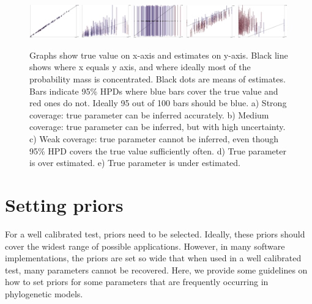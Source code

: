 \documentclass[oneside]{article}
\begin{document}
\begin{figure}
\includegraphics[width=0.19\textwidth]{../figures/bargraph-ok-strong}
\includegraphics[width=0.19\textwidth]{../figures/bargraph-ok-medium}
\includegraphics[width=0.19\textwidth]{../figures/bargraph-ok-weak}
\includegraphics[width=0.19\textwidth]{../figures/bargraph-under}
\includegraphics[width=0.19\textwidth]{../figures/bargraph-over}
\caption{\label{fig:coverage}
Graphs show true value on x-axis and estimates on y-axis. Black line shows where x equals y axis, and where ideally most of the probability mass is concentrated. Black dots are means of estimates. Bars indicate 95\% HPDs where blue bars cover the true value and red ones do not. Ideally 95 out of 100 bars should be blue.
a) Strong coverage: true parameter can be inferred accurately.
b) Medium coverage: true parameter can be inferred, but with high uncertainty.
c) Weak coverage: true parameter cannot be inferred, even though 95\% HPD covers the true value sufficiently often.
d) True parameter is over estimated.
e) True parameter is under estimated.
}
\end{figure}


\section{Setting priors}\label{setting-priors}

For a well calibrated test, priors need to be selected. Ideally, these priors should 
cover the widest range of possible applications. However, in many software implementations,
the priors are set so wide that when used in a well calibrated test, many parameters cannot
be recovered. Here, we provide some guidelines on how to set priors for some parameters
that are frequently occurring in phylogenetic models.
\end{document}
